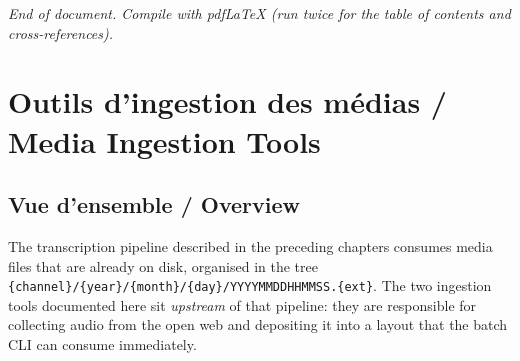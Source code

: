 \documentclass[11pt,a4paper]{report}
\newcommand{\code}[1]{\texttt{\small #1}}
\begin{document}
\vfill
\begin{center}\itshape
End of document. Compile with pdfLaTeX (run twice for the table of contents and
cross-references).
\end{center}

\chapter{Outils d'ingestion des médias / Media Ingestion Tools}
\label{ch:ingestion}

\section{Vue d'ensemble / Overview}

The transcription pipeline described in the preceding chapters consumes media
files that are already on disk, organised in the tree
\code{\{channel\}/\{year\}/\{month\}/\{day\}/YYYYMMDDHHMMSS.\{ext\}}.  The two
ingestion tools documented here sit \emph{upstream} of that pipeline: they are
responsible for collecting audio from the open web and depositing it into a
layout that the batch CLI can consume immediately.
\end{document}
